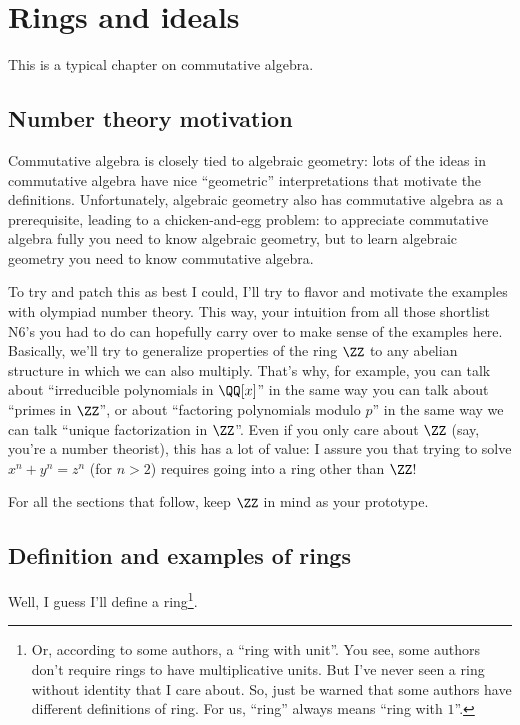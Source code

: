 \chapter{Rings and ideals}
This is a typical chapter on commutative algebra.

\section{Number theory motivation}
Commutative algebra is closely tied to algebraic geometry:
lots of the ideas in commutative algebra have nice ``geometric'' interpretations that motivate the definitions.
Unfortunately, algebraic geometry also has commutative algebra as a prerequisite, leading to a
chicken-and-egg problem: to appreciate commutative algebra fully you need to know algebraic geometry,
but to learn algebraic geometry you need to know commutative algebra.

To try and patch this as best I could, I'll try to flavor and motivate the examples with olympiad number theory.
This way, your intuition from all those shortlist N6's
you had to do can hopefully carry over to make sense of the examples here.
Basically, we'll try to generalize properties of the ring $\ZZ$ to
any abelian structure in which we can also multiply.
That's why, for example, you can talk about ``irreducible polynomials in $\QQ[x]$'' in the same
way you can talk about ``primes in $\ZZ$'', or about ``factoring polynomials modulo $p$''
in the same way we can talk ``unique factorization in $\ZZ$''.
Even if you only care about $\ZZ$ (say, you're a number theorist), this has a lot of value:
I assure you that trying to solve $x^n+y^n = z^n$ (for $n > 2$) requires going into a ring other than $\ZZ$!

For all the sections that follow, keep $\ZZ$ in mind as your prototype.

\section{Definition and examples of rings}

Well, I guess I'll define a ring\footnote{%
	Or, according to some authors, a ``ring with unit''.
	You see, some authors don't require rings to have multiplicative units.
	But I've never seen a ring without identity that I care about.
	So, just be warned that some authors have different definitions of ring.
	For us, ``ring'' always means ``ring with $1$''.}.

